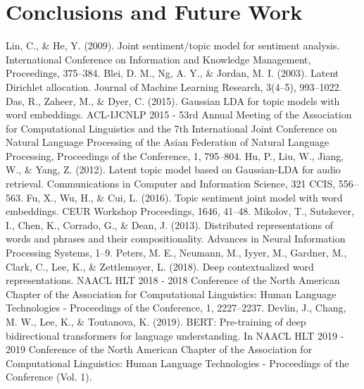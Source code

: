 \documentclass[uplatex]{jsarticle}
\begin{document}
\section{Conclusions and Future Work}



\begin{thebibliography}{数字}
     Lin, C., \& He, Y. (2009). Joint sentiment/topic model for sentiment analysis. International Conference on Information and Knowledge Management, Proceedings, 375–384.
     Blei, D. M., Ng, A. Y., \& Jordan, M. I. (2003). Latent Dirichlet allocation. Journal of Machine Learning Research, 3(4–5), 993–1022.
     Das, R., Zaheer, M., \& Dyer, C. (2015). Gaussian LDA for topic models with word embeddings. ACL-IJCNLP 2015 - 53rd Annual Meeting of the Association for Computational Linguistics and the 7th International Joint Conference on Natural Language Processing of the Asian Federation of Natural Language Processing, Proceedings of the Conference, 1, 795–804.
     Hu, P., Liu, W., Jiang, W., \& Yang, Z. (2012). Latent topic model based on Gaussian-LDA for audio retrieval. Communications in Computer and Information Science, 321 CCIS, 556–563.
     Fu, X., Wu, H., \& Cui, L. (2016). Topic sentiment joint model with word embeddings. CEUR Workshop Proceedings, 1646, 41–48.
     Mikolov, T., Sutskever, I., Chen, K., Corrado, G., \& Dean, J. (2013). Distributed representations of words and phrases and their compositionality. Advances in Neural Information Processing Systems, 1–9.
     Peters, M. E., Neumann, M., Iyyer, M., Gardner, M., Clark, C., Lee, K., \& Zettlemoyer, L. (2018). Deep contextualized word representations. NAACL HLT 2018 - 2018 Conference of the North American Chapter of the Association for Computational Linguistics: Human Language Technologies - Proceedings of the Conference, 1, 2227–2237.
     Devlin, J., Chang, M. W., Lee, K., \& Toutanova, K. (2019). BERT: Pre-training of deep bidirectional transformers for language understanding. In NAACL HLT 2019 - 2019 Conference of the North American Chapter of the Association for Computational Linguistics: Human Language Technologies - Proceedings of the Conference (Vol. 1).

\end{thebibliography}
\end{document}
